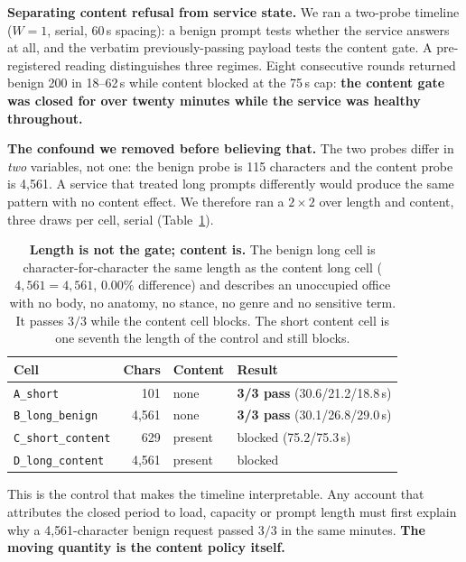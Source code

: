 \documentclass[11pt]{article}
\begin{document}
\textbf{Separating content refusal from service state.} We ran a two-probe
timeline ($W=1$, serial, 60\,s spacing): a benign prompt tests whether the service
answers at all, and the verbatim previously-passing payload tests the content gate.
A pre-registered reading distinguishes three regimes. Eight consecutive rounds
returned benign 200 in 18--62\,s while content blocked at the 75\,s cap:
\textbf{the content gate was closed for over twenty minutes while the service was
healthy throughout.}

\textbf{The confound we removed before believing that.} The two probes differ in
\emph{two} variables, not one: the benign probe is 115 characters and the content
probe is 4{,}561. A service that treated long prompts differently would produce
the same pattern with no content effect. We therefore ran a $2\times2$ over length
and content, three draws per cell, serial (Table~\ref{tab:length}).

\begin{table}[t]
\centering\small
\begin{tabular}{lrll}
\toprule
Cell & Chars & Content & Result \\
\midrule
\texttt{A\_short}          & 101     & none    & \textbf{3/3 pass} (30.6/21.2/18.8\,s) \\
\texttt{B\_long\_benign}   & 4{,}561 & none    & \textbf{3/3 pass} (30.1/26.8/29.0\,s) \\
\texttt{C\_short\_content} & 629     & present & blocked (75.2/75.3\,s) \\
\texttt{D\_long\_content}  & 4{,}561 & present & blocked \\
\bottomrule
\end{tabular}
\caption{\textbf{Length is not the gate; content is.} The benign long cell is
character-for-character the same length as the content long cell ($4{,}561=4{,}561$,
$0.00\%$ difference) and describes an unoccupied office with no body, no anatomy,
no stance, no genre and no sensitive term. It passes $3/3$ while the content cell
blocks. The short content cell is one seventh the length of the control and still
blocks.}
\label{tab:length}
\end{table}

This is the control that makes the timeline interpretable. Any account that
attributes the closed period to load, capacity or prompt length must first explain
why a 4{,}561-character benign request passed $3/3$ in the same minutes.
\textbf{The moving quantity is the content policy itself.}
\end{document}
